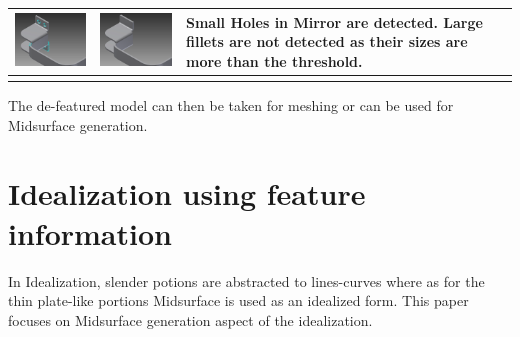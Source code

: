 \begin{longtable}{ C{0.28\textwidth}  C{0.28\textwidth}  L{0.4\textwidth}}
\includegraphics[scale=.72]{..//Common/images//defeatmodel2.png} &
\includegraphics[scale=.72]{..//Common/images//defeatresult2.png} &
Small Holes in Mirror are detected. Large fillets are not detected as their sizes are more than the threshold. \\
%
%
\hline
\label{Defeat}
\end{longtable}


The de-featured model can then be taken for meshing or can be used for Midsurface generation.


\section{Idealization using feature information}

In Idealization, slender potions are abstracted to lines-curves where as for the thin plate-like portions Midsurface is used as an idealized form.  This paper focuses on Midsurface generation aspect of the idealization.
%	
	
